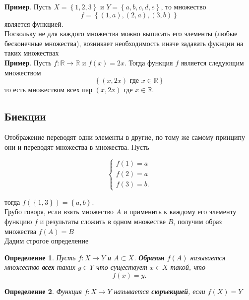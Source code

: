 \documentclass[]{article}
\newtheorem{definition}{Определение}
\begin{document}
\textbf{Пример}. Пусть $X=\left\{1,2,3\right\}$ и $Y=\left\{a,b,c,d,e\right\}$, то множество 
\begin{equation}
	f=\left\{(1,a),(2,a),(3,b)\right\}
\end{equation}
является функцией.
\\
	
	Поскольку не для каждого множества можно выписать его элементы (любые бесконечные множества), возникает необходимость иначе задавать фукнции на таких множествах
\\
	
	\textbf{Пример}. Пусть $f:\mathbb{R}\rightarrow\mathbb{R}$ и $f(x)=2x$.
	Тогда функция $f$ является следующим множеством 
	\begin{equation}
		\left\{(x,2x)\text{ где }x\in\mathbb{R}\right\}
	\end{equation}
	то есть множеством всех пар $(x,2x)$ где $x\in\mathbb{R}$.
	
	\subsection{Биекции}
	
	Отображение переводят одни элементы в другие, по тому же самому принципу они и переводят множества в множества. Пусть
	
		\begin{equation}
		\begin{cases}
			f(1)=a
			\\
			f(2)=a
			\\
			f(3)=b.
		\end{cases}
	\end{equation}
	
	тогда $f(\left\{1,3\right\})=\left\{a,b\right\}$.
	\\
	
	Грубо говоря, если взять множество $A$ и применить к каждому его элементу функцию $f$ и результаты сложить в одном множестве $B$, получим образ множества $f(A)=B$
	\\
	
	Дадим строгое определение
	
	\begin{definition}
		Пусть $f:X\rightarrow Y$ и $A\subset X$. \textbf{Образом} $f(A)$ называется множество \textbf{всех} таких $y\in Y$ что существует $x\in X$ такой, что $$f(x)=y.$$
	\end{definition}
	
	\begin{definition}
		Функция $f:X\rightarrow Y$ называется \textbf{сюръекцией}, если $f(X) = Y$
	\end{definition}
\end{document}

